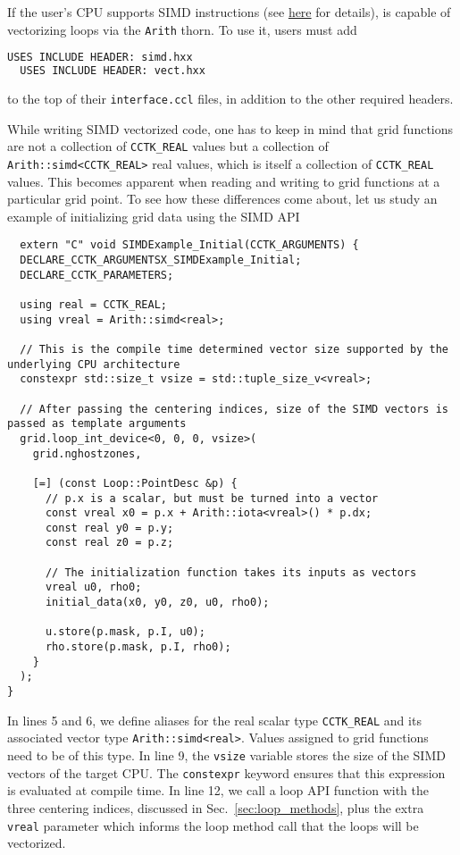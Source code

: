 If the user's CPU supports SIMD instructions (see \href{https://en.wikipedia.org/wiki/Single_instruction,_multiple_data}{here} for details), \CarpetX\space is capable of vectorizing loops via the \texttt{Arith} thorn. To use it, users must add
%
\begin{lstlisting}[language=bash]
  USES INCLUDE HEADER: simd.hxx
  USES INCLUDE HEADER: vect.hxx
\end{lstlisting}
%
to the top of their \texttt{interface.ccl} files, in addition to the other required headers.

While writing SIMD vectorized code, one has to keep in mind that grid functions are not a collection of \texttt{CCTK\_REAL} values but a collection of \texttt{Arith::simd<CCTK\_REAL>} real values, which is itself a collection of \texttt{CCTK\_REAL} values. This becomes apparent when reading and writing to grid functions at a particular grid point. To see how these differences come about, let us study an example of initializing grid data using the SIMD API
%
\begin{lstlisting}
  extern "C" void SIMDExample_Initial(CCTK_ARGUMENTS) {
  DECLARE_CCTK_ARGUMENTSX_SIMDExample_Initial;
  DECLARE_CCTK_PARAMETERS;

  using real = CCTK_REAL;
  using vreal = Arith::simd<real>;
  
  // This is the compile time determined vector size supported by the underlying CPU architecture
  constexpr std::size_t vsize = std::tuple_size_v<vreal>;

  // After passing the centering indices, size of the SIMD vectors is passed as template arguments
  grid.loop_int_device<0, 0, 0, vsize>(
    grid.nghostzones,
    
    [=] (const Loop::PointDesc &p) {
      // p.x is a scalar, but must be turned into a vector
      const vreal x0 = p.x + Arith::iota<vreal>() * p.dx;
      const real y0 = p.y;
      const real z0 = p.z;
      
      // The initialization function takes its inputs as vectors
      vreal u0, rho0;
      initial_data(x0, y0, z0, u0, rho0);
      
      u.store(p.mask, p.I, u0);
      rho.store(p.mask, p.I, rho0);
    }
  );
}
\end{lstlisting}

In lines 5 and 6, we define aliases for the real scalar type \texttt{CCTK\_REAL} and its associated vector type \texttt{Arith::simd<real>}. Values assigned to grid functions need to be of this type. In line 9, the \texttt{vsize} variable stores the size of the SIMD vectors of the target CPU. The \texttt{constexpr} keyword ensures that this expression is evaluated at compile time. In line 12, we call a loop API function with the three centering indices, discussed in Sec.~\ref{sec:loop_methods}, plus the extra \texttt{vreal} parameter which informs the loop method call that the loops will be vectorized.


